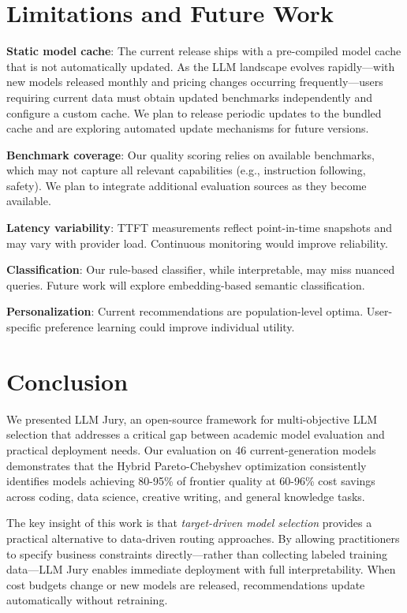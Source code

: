 \documentclass[11pt,a4paper]{article}
\begin{document}
\section{Limitations and Future Work}

\textbf{Static model cache}: The current release ships with a pre-compiled model cache that is not automatically updated. As the LLM landscape evolves rapidly---with new models released monthly and pricing changes occurring frequently---users requiring current data must obtain updated benchmarks independently and configure a custom cache. We plan to release periodic updates to the bundled cache and are exploring automated update mechanisms for future versions.

\textbf{Benchmark coverage}: Our quality scoring relies on available benchmarks, which may not capture all relevant capabilities (e.g., instruction following, safety). We plan to integrate additional evaluation sources as they become available.

\textbf{Latency variability}: TTFT measurements reflect point-in-time snapshots and may vary with provider load. Continuous monitoring would improve reliability.

\textbf{Classification}: Our rule-based classifier, while interpretable, may miss nuanced queries. Future work will explore embedding-based semantic classification.

\textbf{Personalization}: Current recommendations are population-level optima. User-specific preference learning could improve individual utility.


\section{Conclusion}

We presented LLM Jury, an open-source framework for multi-objective LLM selection that addresses a critical gap between academic model evaluation and practical deployment needs. Our evaluation on 46 current-generation models demonstrates that the Hybrid Pareto-Chebyshev optimization consistently identifies models achieving 80-95\% of frontier quality at 60-96\% cost savings across coding, data science, creative writing, and general knowledge tasks.

The key insight of this work is that \textit{target-driven model selection} provides a practical alternative to data-driven routing approaches. By allowing practitioners to specify business constraints directly---rather than collecting labeled training data---LLM Jury enables immediate deployment with full interpretability. When cost budgets change or new models are released, recommendations update automatically without retraining.
\end{document}
